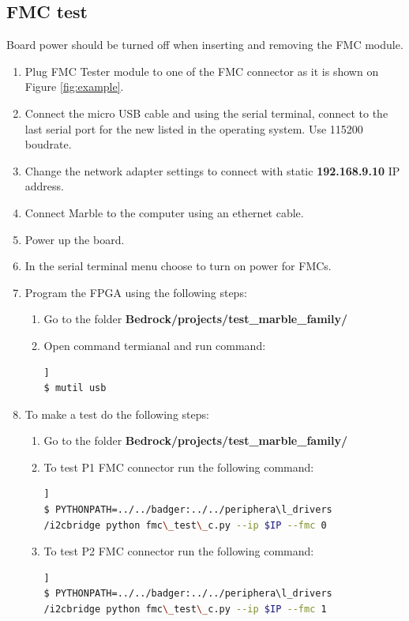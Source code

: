 \documentclass[12pt,oneside,a4]{article}
\begin{document}
\subsection{FMC test}
\begin{leftbar}
Board power should be turned off when inserting and removing the FMC module.
\end{leftbar}
\begin{enumerate}
	\item Plug FMC Tester module to one of the FMC connector as it is shown on Figure \ref{fig:example}.
	\item Connect the micro USB cable and using the serial terminal, connect to the last serial port for the new listed in the operating system. Use 115200 boudrate.
	\item Change the network adapter settings to connect with static \textbf{192.168.9.10} IP address.
    \item Connect Marble to the computer using an ethernet cable.
    \item Power up the board.
    \item In the serial terminal menu choose  to turn on power for FMCs.
	\item Program the FPGA using the following steps:
	\begin{enumerate}
	\item Go to the folder \textbf{Bedrock/projects/test\_marble\_family/}
	\item Open command termianal and run command: 
	\begin{lstlisting}[backgroundcolor = \color{Gainsboro}, language=bash, frame=none]]
$ mutil usb
	\end{lstlisting}
	\end{enumerate}
	\item To make a test do the following steps:
	\begin{enumerate}	
	\item Go to the folder \textbf{Bedrock/projects/test\_marble\_family/}
	\item To test P1 FMC connector run the following command:
	\begin{lstlisting}[backgroundcolor = \color{Gainsboro}, language=bash, frame=none]]
$ PYTHONPATH=../../badger:../../periphera\l_drivers
/i2cbridge python fmc\_test\_c.py --ip $IP --fmc 0
	\end{lstlisting}
	\item To test P2 FMC connector run the following command:
	\begin{lstlisting}[backgroundcolor = \color{Gainsboro}, language=bash, frame=none]]
$ PYTHONPATH=../../badger:../../periphera\l_drivers
/i2cbridge python fmc\_test\_c.py --ip $IP --fmc 1
	\end{lstlisting}
	\end{enumerate}
\end{enumerate}
\end{document}

